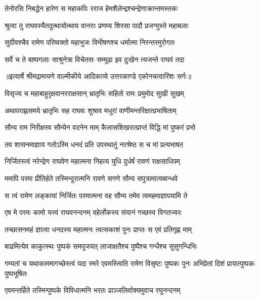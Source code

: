 \twolineshloka
{तेनोरसि निबद्धेन हारेण स महाकपिः}
{रराज हेमशैलेन्द्रश्चन्द्रेणाक्रान्तमस्तकः} %

\twolineshloka
{श्रुत्वा तु राघवस्यैतदुत्थायोत्थाय वानराः}
{प्रणम्य शिरसा पादौ प्रजग्मुस्ते महाबलाः} %

\twolineshloka
{सुग्रीवश्चैव रामेण परिष्वक्तो महाभुजः}
{विभीषणश्च धर्मात्मा निरन्तरमुरोगतः} %

\twolineshloka
{सर्वे च ते बाष्पगलाः साश्रुनेत्रा विचेतसः}
{सम्मूढा इव दुःखेन त्यजन्ते राघवं तदा} %


{॥इत्यार्षे श्रीमद्रामायणे वाल्मीकीये आदिकाव्ये उत्तरकाण्डे एकोनचत्वारिंशः सर्गः॥}


\twolineshloka
{विसृज्य च महाबाहुरृक्षवानरराक्षसान्}
{भ्रातृभिः सहितो रामः प्रमुमोद सुखी सुखम्} %

\twolineshloka
{अथापराह्णसमये भ्रातृभिः सह राघवः}
{शुश्राव मधुरां वाणीमन्तरिक्षात्प्रभाषिताम्} %

\twolineshloka
{सौम्य राम निरीक्षस्व सौम्येन वदनेन माम्}
{कैलासशिखरात्प्राप्तं विद्धि मां पुष्करं प्रभो} %

\twolineshloka
{तव शासनमाज्ञाय गतोऽस्मि धनदं प्रति}
{उपस्थातुं नरश्रेष्ठ स च मां प्रत्यभाषत} %

\twolineshloka
{निर्जितस्त्वं नरेन्द्रेण राघवेण महात्मना}
{निहत्य युधि दुर्धर्षं रावणं राक्षसाधिपम्} %

\twolineshloka
{ममापि परमा प्रीतिर्हते तस्मिन्दुरात्मनि}
{रावणे सगणे सौम्य सपुत्रामात्यबान्धवे} %

\twolineshloka
{स त्वं रामेण लङ्कायां निर्जितः परमात्मना}
{वह सौम्य तमेव त्वमहमाज्ञापयामि ते} %

\twolineshloka
{एष मे परमः कामो यत्त्वं राघवनन्दनम्}
{वहेर्लोकस्य संयानं गच्छस्व विगतज्वरः} %

\twolineshloka
{तच्छासनमहं ज्ञात्वा धनदस्य महात्मनः}
{त्वत्सकाशं पुनः प्राप्तः स एवं प्रतिगृह्ण माम्} %

\twolineshloka
{बाढमित्येव काकुत्स्थः पुष्पकं समपूजयत्}
{लाजाक्षतैश्च पुष्पैश्च गन्धैश्च सुसुगन्धिभिः} %

\threelineshloka
{गम्यतां च यथाकाममागच्छेस्त्वं यदा स्मरे}
{एवमस्त्विति रामेण विसृष्टः पुष्पकः पुनः}
{अभिप्रेतां दिशं प्रायात्पुष्पकः पुष्पभूषितः} %

\twolineshloka
{एवमन्तर्हिते तस्मिन्पुष्पके विविधात्मनि}
{भरतः प्राञ्जलिर्वाक्यमुवाच रघुनन्दनम्} %

